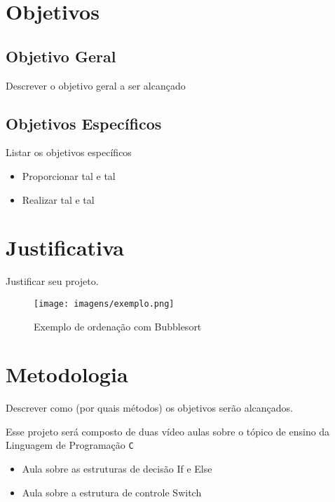 \documentclass[a4paper,10pt]{article}  %
\begin{document}
\section{Objetivos}

\subsection{Objetivo Geral}

Descrever o objetivo geral a ser alcançado

\subsection{Objetivos Específicos}

Listar os objetivos específicos

\begin{itemize}
 \item Proporcionar tal e tal
 \item Realizar tal e tal
\end{itemize}


\section{Justificativa}

Justificar seu projeto.

\begin{figure}[ht]
\centering
\texttt{[image: imagens/exemplo.png]}
\caption{Exemplo de ordenação com Bubblesort}
\label{fig:xsort}
\end{figure}


\section{Metodologia}

Descrever como (por quais métodos) os objetivos serão alcançados.

 Esse projeto será composto de duas vídeo aulas sobre o tópico de ensino da Linguagem de Programação \texttt{C}

\begin{itemize}

 \item Aula sobre as estruturas de decisão If e Else
 \item Aula sobre a estrutura de controle Switch
\end{itemize}
\end{document}
